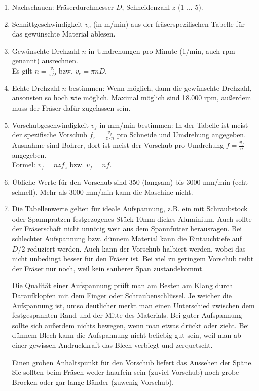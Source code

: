 \documentclass{\basedir/fablab-document}
\begin{document}
\begin{enumerate}
	\item Nachschauen: Fräserdurchmesser $D$, Schneidenzahl $z$ (1 ... 5).
	\item Schnittgeschwindigkeit $v_c$ (in m/min) aus der fräserspezifischen Tabelle für das gewünschte Material ablesen.
	\item Gewünschte Drehzahl $n$ in Umdrehungen pro Minute (1/min, auch rpm genannt) ausrechnen.\\
		Es gilt $n=\frac{v_c}{\pi D}$ bzw. $v_c=\pi n D$.
	\item Echte Drehzahl $n$ bestimmen: Wenn möglich, dann die gewünschte Drehzahl, ansonsten so hoch wie möglich. Maximal möglich sind 18.000 rpm, außerdem muss der Fräser dafür zugelassen sein.
	\item Vorschubgeschwindigkeit $v_f$ in mm/min bestimmen: In der Tabelle ist meist der spezifische Vorschub $f_z=\frac{v_f}{z\cdot n}$ pro Schneide und Umdrehung angegeben. Ausnahme sind Bohrer, dort ist meist der Vorschub pro Umdrehung $f=\frac{v_f}{n}$ angegeben. \\
		Formel: $v_f = n z f_z$ bzw. $v_f=n f$.
	\item Übliche Werte für den Vorschub sind 350 (langsam) bis 3000 mm/min (echt schnell). Mehr als 3000 mm/min kann die Maschine nicht.
	\item Die Tabellenwerte gelten für ideale Aufspannung, z.B. ein mit Schraubstock oder Spannpratzen festgezogenes Stück 10mm dickes Aluminium. Auch sollte der Fräserschaft nicht unnötig weit aus dem Spannfutter herausragen. Bei schlechter Aufspannung bzw. dünnem Material kann die Eintauchtiefe auf $D/2$ reduziert werden. Auch kann der Vorschub halbiert werden, wobei das nicht unbedingt besser für den Fräser ist. Bei viel zu geringem Vorschub reibt der Fräser nur noch, weil kein sauberer Span zustandekommt.

		Die Qualität einer Aufspannung prüft man am Besten am Klang durch Daraufklopfen mit dem Finger oder Schraubenschlüssel. Je weicher die Aufspannung ist, umso deutlicher merkt man einen Unterschied zwischen dem festgespannten Rand und der Mitte des Materials. Bei guter Aufspannung sollte sich außerdem nichts bewegen, wenn man etwas drückt oder zieht. Bei dünnem Blech kann die Aufspannung nicht beliebig gut sein, weil man ab einer gewissen Andruckkraft das Blech verbiegt und zerquetscht.
		
		Einen groben Anhaltspunkt für den Vorschub liefert das Aussehen der Späne. Sie sollten beim Fräsen weder haarfein sein (zuviel Vorschub) noch grobe Brocken oder gar lange Bänder (zuwenig Vorschub).
\end{enumerate}
\end{document}
